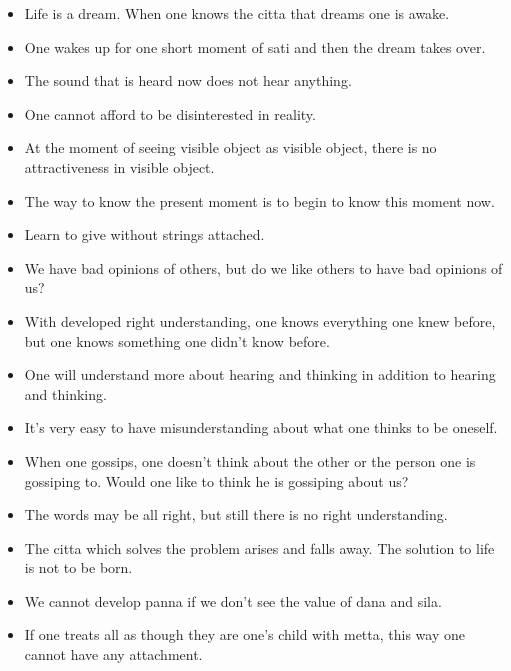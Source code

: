 \documentclass{article}
\begin{document}
\begin{itemize}
\item 
  Life is a dream. When one knows the citta that dreams one is
  awake.

\item 
  One wakes up for one short moment of sati and then the dream takes
  over.

\item 
  The sound that is heard now does not hear anything.

\item 
  One cannot afford to be disinterested in reality.

\item 
  At the moment of seeing visible object as visible object, there is
  no attractiveness in visible object.

\item 
  The way to know the present moment is to begin to know this moment
  now.

\item 
  Learn to give without strings attached.

\item 
  We have bad opinions of others, but do we like others to have bad
  opinions of us?

\item 
  With developed right understanding, one knows everything one knew
  before, but one knows something one didn't know before.

\item 
  One will understand more about hearing and thinking in addition to
  hearing and thinking.

\item 
  It's very easy to have misunderstanding about what one thinks to be
  oneself.

\item 
  When one gossips, one doesn't think about the other or the person
  one is gossiping to. Would one like to think he is gossiping about
  us?

\item 
  The words may be all right, but still there is no right
  understanding.

\item 
  The citta which solves the problem arises and falls away. The
  solution to life is not to be born.

\item 
  We cannot develop panna if we don't see the value of dana and
  sila.

\item 
  If one treats all as though they are one's child with metta, this
  way one cannot have any attachment.


\end{itemize}
\end{document}
